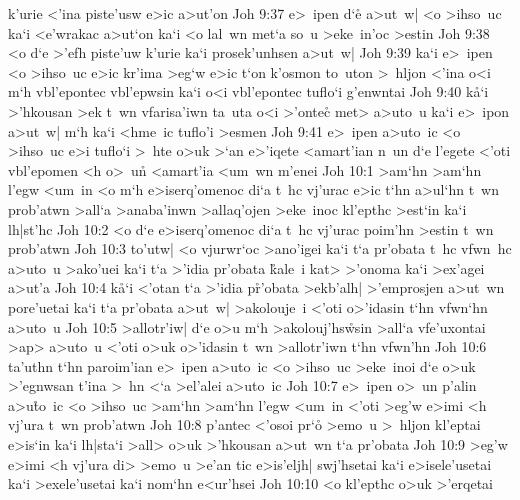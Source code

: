 k'urie
<'ina
piste'usw
e>ic
a>ut'on\bibvsend
\vs Joh 9:37
e>~ipen
d`e\r{}
a>ut~w|
<o
>ihso~uc
ka`i
<e'wrakac
a>ut`on
ka`i
<o
lal~wn
met`a
so~u
>eke~in'oc
>estin\bibvsend
\vs Joh 9:38
<o
d`e
>'efh
piste'uw
k'urie
ka`i
prosek'unhsen
a>ut~w|\bibvsend
\vs Joh 9:39
ka`i
e>~ipen
<o
>ihso~uc
e>ic
kr'ima
>eg`w
e>ic
t`on
k'osmon
to~uton
>~hljon
<'ina
o<i
m`h
vbl'epontec
vbl'epwsin
ka`i
o<i
vbl'epontec
tuflo`i
g'enwntai\bibvsend
\vs Joh 9:40
k\r{a}`i
>'hkousan
>ek
t~wn
vfarisa'iwn
ta~uta
o<i
>'ontec\r{}
met>
a>uto~u
ka`i
e>~ipon
a>ut~w|
m`h
ka`i
<hme~ic
tuflo'i
>esmen\bibvsend
\vs Joh 9:41
e>~ipen
a>uto~ic
<o
>ihso~uc
e>i
tuflo`i
>~hte
o>uk
>`an
e>'iqete
<amart'ian
n~un
d`e
l'egete
<'oti
vbl'epomen
<h
o>~u\r{n}
<amart'ia
<um~wn
m'enei\bibvsend
\vs Joh 10:1
>am`hn
>am`hn
l'egw
<um~in
<o
m`h
e>iserq'omenoc
di`a
t~hc
vj'urac
e>ic
t`hn
a>ul`hn
t~wn
prob'atwn
>all`a
>anaba'inwn
>allaq'ojen
>eke~inoc
kl'epthc
>est`in
ka`i
lh|st'hc\bibvsend
\vs Joh 10:2
<o
d`e
e>iserq'omenoc
di`a
t~hc
vj'urac
poim'hn
>estin
t~wn
prob'atwn\bibvsend
\vs Joh 10:3
to'utw|
<o
vjurwr`oc
>ano'igei
ka`i
t`a
pr'obata
t~hc
vfwn~hc
a>uto~u
>ako'uei
ka`i
t`a
>'idia
pr'obata
\r{k}ale~i
kat>
>'onoma
ka`i
>ex'agei
a>ut'a\bibvsend
\vs Joh 10:4
k\r{a}`i
<'otan
t`a
>'idia
p\r{r}'obata
>ekb'alh|
>'emprosjen
a>ut~wn
pore'uetai
ka`i
t`a
pr'obata
a>ut~w|
>akolouje~i
<'oti
o>'idasin
t`hn
vfwn`hn
a>uto~u\bibvsend
\vs Joh 10:5
>allotr'iw|
d`e
o>u
m`h
>akolouj'hs\r{w}sin
>all`a
vfe'uxontai
>ap>
a>uto~u
<'oti
o>uk
o>'idasin
t~wn
>allotr'iwn
t`hn
vfwn'hn\bibvsend
\vs Joh 10:6
ta'uthn
t`hn
paroim'ian
e>~ipen
a>uto~ic
<o
>ihso~uc
>eke~inoi
d`e
o>uk
>'egnwsan
t'ina
>~hn
<`a
>el'alei
a>uto~ic\bibvsend
\vs Joh 10:7
e>~ipen
o>~un
p'alin
a>u\r{t}o~ic
<o
>ihso~uc
>am`hn
>am`hn
l'egw
<um~in
<'oti
>eg'w
e>imi
<h
vj'ura
t~wn
prob'atwn\bibvsend
\vs Joh 10:8
p'antec
<'osoi
pr`o\r{}
>emo~u
>~hljon
kl'eptai
e>is`in
ka`i
lh|sta`i
>all>
o>uk
>'hkousan
a>ut~wn
t`a
pr'obata\bibvsend
\vs Joh 10:9
>eg'w
e>imi
<h
vj'ura
di>
>emo~u
>e'an
tic
e>is'eljh|
swj'hsetai
ka`i
e>isele'usetai
ka`i
>exele'usetai
ka`i
nom`hn
e<ur'hsei\bibvsend
\vs Joh 10:10
<o
kl'epthc
o>uk
>'erqetai
